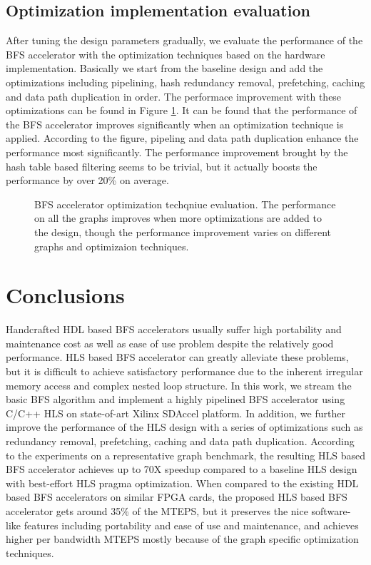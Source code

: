 \subsection{Optimization implementation evaluation}
After tuning the design parameters gradually, we evaluate the 
performance of the BFS accelerator with the optimization techniques based on 
the hardware implementation. Basically we start from the baseline design and 
add the optimizations including pipelining, hash redundancy removal, 
prefetching, caching and data path duplication in order. The performace improvement 
with these optimizations can be found in Figure \ref{fig:opt-performance}. 
It can be found that the performance of the BFS accelerator improves 
significantly when an optimization technique is applied. According to the figure,
pipeling and data path duplication enhance the performance most 
significantly. The performance improvement brought by the hash table based filtering 
seems to be trivial, but it actually boosts the performance by over 20\% on average. 

\begin{figure}
    \caption{BFS accelerator optimization techqniue evaluation. The performance on 
    all the graphs improves when more optimizations are added to the design, though 
    the performance improvement varies on different graphs and optimizaion 
    techniques.}
\label{fig:opt-performance}
\end{figure}

\section{Conclusions} \label{sec:conclusion}
Handcrafted HDL based BFS accelerators usually suffer high portability and maintenance cost 
as well as ease of use problem despite the relatively 
good performance. HLS based BFS accelerator can greatly alleviate these problems, but it is 
difficult to achieve satisfactory performance due to the inherent irregular memory access and 
complex nested loop structure. In this work, we stream the basic BFS algorithm and implement a 
highly pipelined BFS accelerator using C/C++ HLS on state-of-art Xilinx SDAccel platform. In addition, 
we further improve the performance of the HLS design with a series of optimizations such as 
redundancy removal, prefetching, caching and data path duplication. According to the experiments on 
a representative graph benchmark, the resulting HLS based BFS accelerator achieves up to 70X speedup 
compared to a baseline HLS design with best-effort HLS pragma optimization. When compared to the 
existing HDL based BFS accelerators on similar FPGA cards, the proposed HLS based BFS accelerator 
gets around 35\% of the MTEPS, but it preserves the nice software-like features including 
portability and ease of use and maintenance, and achieves higher per bandwidth MTEPS mostly 
because of the graph specific optimization techniques. 

